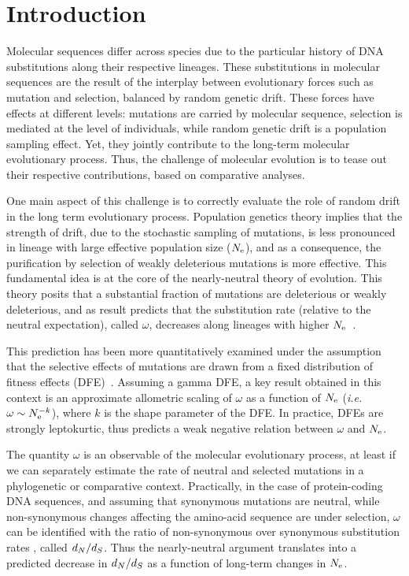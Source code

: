\section{Introduction}
Molecular sequences differ across species due to the particular history of \acrshort{DNA} substitutions along their respective lineages.
These substitutions in molecular sequences are the result of the interplay between evolutionary forces such as mutation and selection, balanced by random genetic drift.
These forces have effects at different levels: mutations are carried by molecular sequence, selection is mediated at the level of individuals, while random genetic drift is a population sampling effect.
Yet, they jointly contribute to the long-term molecular evolutionary process.
Thus, the challenge of molecular evolution is to tease out their respective contributions, based on comparative analyses.

One main aspect of this challenge is to correctly evaluate the role of random drift in the long term evolutionary process.
Population genetics theory implies that the strength of drift, due to the stochastic sampling of mutations, is less pronounced in lineage with large effective population size ($N_{\mathrm{e}}$), and as a consequence, the purification by selection of weakly deleterious mutations is more effective.
This fundamental idea is at the core of the nearly-neutral theory of evolution.
This theory posits that a substantial fraction of mutations are deleterious or weakly deleterious, and as result predicts that the substitution rate (relative to the neutral expectation), called $\omega$, decreases along lineages with higher $N_{\mathrm{e}}$~\citep{Ohta1972, Ohta1992}.

This prediction has been more quantitatively examined under the assumption that the selective effects of mutations are drawn from a fixed distribution of fitness effects (\acrshort{DFE})~\citep{Kimura1979, Welch2008}.
Assuming a gamma \acrshort{DFE}, a key result obtained in this context is an approximate allometric scaling of $\omega$ as a function of $N_{\mathrm{e}}$ (\textit{i.e.} $\omega \sim N_{\mathrm{e}}^{-k}$), where $k$ is the shape parameter of the \acrshort{DFE}.
In practice, DFEs are strongly leptokurtic, thus predicts a weak negative relation between $\omega$ and $N_{\mathrm{e}}$.

The quantity $\omega$ is an observable of the molecular evolutionary process, at least if we can separately estimate the rate of neutral and selected mutations in a phylogenetic or comparative context.
Practically, in the case of protein-coding \acrshort{DNA} sequences, and assuming that synonymous mutations are neutral, while non-synonymous changes affecting the amino-acid sequence are under selection, $\omega$ can be identified with the ratio of non-synonymous over synonymous substitution rates , called $d_N / d_S$.
Thus the nearly-neutral argument translates into a predicted decrease in $d_N / d_S$ as a function of long-term changes in $N_{\mathrm{e}}$.

